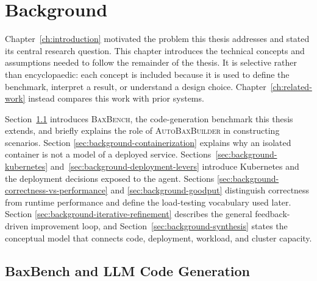 

\chapter{Background}
\label{ch:background}

Chapter~\ref{ch:introduction} motivated the problem this thesis addresses and
stated its central research question. This chapter introduces the technical
concepts and assumptions needed to follow the remainder of the thesis. It is
selective rather than encyclopaedic: each concept is included because it is
used to define the benchmark, interpret a result, or understand a design
choice. Chapter~\ref{ch:related-work} instead compares this work with prior
systems.

Section~\ref{sec:background-codegen} introduces \textsc{BaxBench}, the
code-generation benchmark this thesis extends, and briefly explains the role
of \textsc{AutoBaxBuilder} in constructing scenarios. Section
\ref{sec:background-containerization} explains why an isolated container is
not a model of a deployed service. Sections~\ref{sec:background-kubernetes}
and~\ref{sec:background-deployment-levers} introduce Kubernetes and the
deployment decisions exposed to the agent. Sections
\ref{sec:background-correctness-vs-performance} and
\ref{sec:background-goodput} distinguish correctness from runtime performance
and define the load-testing vocabulary used later. Section
\ref{sec:background-iterative-refinement} describes the general
feedback-driven improvement loop, and Section~\ref{sec:background-synthesis}
states the conceptual model that connects code, deployment, workload, and
cluster capacity.


\section{BaxBench and LLM Code Generation}
\label{sec:background-codegen}

